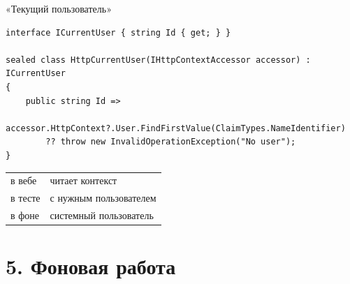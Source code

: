 \documentclass[aspectratio=169,10pt,t]{beamer}
\newcommand{\codesm}{\ttfamily\fontsize{7.6}{9.0}\selectfont}
\begin{document}
\begin{frame}[fragile]{«Текущий пользователь»}
  \vspace{0.3em}
\begin{lstlisting}[style=csharp,basicstyle=\codesm]
interface ICurrentUser { string Id { get; } }

sealed class HttpCurrentUser(IHttpContextAccessor accessor) : ICurrentUser
{
    public string Id =>
        accessor.HttpContext?.User.FindFirstValue(ClaimTypes.NameIdentifier)
        ?? throw new InvalidOperationException("No user");
}
\end{lstlisting}

  \slidegap
  {\renewcommand{\arraystretch}{1.3}\small
  \begin{tabular}{@{}L{3.4cm}L{9.4cm}@{}}
    в вебе     & читает контекст \\
    в тесте    &  с нужным пользователем \\
    в фоне     & системный пользователь \\
  \end{tabular}}

  \vspace{0.4em}
\end{frame}

\begin{frame}[plain]
\end{frame}

\section{5. Фоновая работа}

\begin{frame}[plain]
\end{frame}
\end{document}
